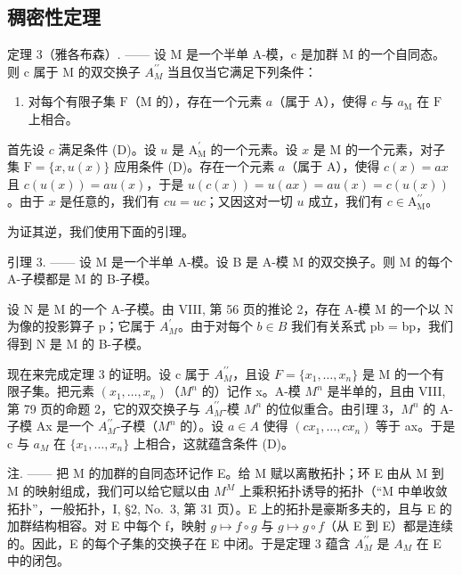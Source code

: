 \subsection{稠密性定理}

定理 3（雅各布森）. —— 设 M 是一个半单 A-模，c 是加群 M 的一个自同态。则 c 属于 M 的双交换子 \(A_{M}^{\prime\prime}\) 当且仅当它满足下列条件：

\begin{enumerate}
\def\labelenumi{(\Alph{enumi})}
\setcounter{enumi}{3}
\tightlist
\item
  对每个有限子集 \(\mathrm{F}\)（\(\mathrm{M}\) 的），存在一个元素 \(a\)（属于 \(\mathrm{A}\)），使得 \(c\) 与 \(a_{\mathrm{M}}\) 在 \(\mathrm{F}\) 上相合。
\end{enumerate}

首先设 \(c\) 满足条件 (D)。设 \(u\) 是 \(\mathrm{A}_{\mathrm{M}}^{\prime}\) 的一个元素。设 \(x\) 是 \(\mathrm{M}\) 的一个元素，对子集 \(\mathrm{F} = \{x, u(x)\}\) 应用条件 (D)。存在一个元素 \(a\)（属于 \(\mathrm{A}\)），使得 \(c(x) = ax\) 且 \(c(u(x)) = au(x)\)，于是 \(u(c(x)) = u(ax) = au(x) = c(u(x))\)。由于 \(x\) 是任意的，我们有 \(cu = uc\)；又因这对一切 \(u\) 成立，我们有 \(c \in \mathrm{A}_{\mathrm{M}}^{\prime \prime}\)。

为证其逆，我们使用下面的引理。

引理 3. —— 设 M 是一个半单 A-模。设 B 是 A-模 M 的双交换子。则 M 的每个 A-子模都是 M 的 B-子模。

设 N 是 M 的一个 A-子模。由 VIII, 第 56 页的推论 2，存在 A-模 M 的一个以 N 为像的投影算子 p；它属于 \(A_{M}^{\prime}\)。由于对每个 \(b \in B\) 我们有关系式 pb = bp，我们得到 N 是 M 的 B-子模。

现在来完成定理 3 的证明。设 c 属于 \(A_{M}^{\prime\prime}\)，且设 \(F = \{x_{1}, \ldots, x_{n}\}\) 是 M 的一个有限子集。把元素 \((x_{1}, \ldots, x_{n})\)（\(M^{n}\) 的）记作 x。A-模 \(M^{n}\) 是半单的，且由 VIII, 第 79 页的命题 2，它的双交换子与 \(A_{M}^{\prime\prime}\)-模 \(M^{n}\) 的位似重合。由引理 3，\(M^{n}\) 的 A-子模 Ax 是一个 \(A_{M}^{\prime\prime}\)-子模（\(M^{n}\) 的）。设 \(a \in A\) 使得 \((cx_{1}, \ldots, cx_{n})\) 等于 ax。于是 c 与 \(a_{M}\) 在 \(\{x_{1}, \ldots, x_{n}\}\) 上相合，这就蕴含条件 (D)。

注. —— 把 M 的加群的自同态环记作 E。给 M 赋以离散拓扑；环 E 由从 M 到 M 的映射组成，我们可以给它赋以由 \(M^{M}\) 上乘积拓扑诱导的拓扑（“M 中单收敛拓扑”，一般拓扑，I, §2, No.~3, 第 31 页）。E 上的拓扑是豪斯多夫的，且与 E 的加群结构相容。对 E 中每个 f，映射 \(g \mapsto f \circ g\) 与 \(g \mapsto g \circ f\)（从 E 到 E）都是连续的。因此，E 的每个子集的交换子在 E 中闭。于是定理 3 蕴含 \(A_{M}^{\prime\prime}\) 是 \(A_{M}\) 在 E 中的闭包。

